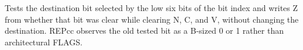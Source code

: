 Tests the destination bit selected by the low six bits of the bit index and writes Z from whether that bit was clear while clearing N, C, and V, without changing the destination. REPcc observes the old tested bit as a B-sized 0 or 1 rather than architectural FLAGS.
